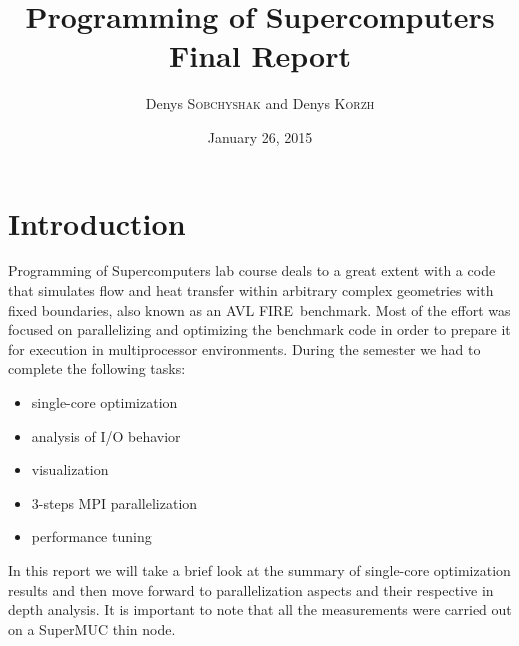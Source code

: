 \documentclass{article}
\title{Programming of Supercomputers \\ Final Report}
\author{Denys \textsc{Sobchyshak} and Denys \textsc{Korzh}}
\date{January 26, 2015}
\begin{document}
\maketitle

\section{Introduction}
Programming of Supercomputers lab course deals to a great extent with a code that simulates flow and heat transfer within arbitrary complex geometries with fixed boundaries, also known as an AVL FIRE\textregistered\ benchmark. Most of the effort was focused on parallelizing and optimizing the benchmark code in order to prepare it for execution in multiprocessor environments. During the semester we had to complete the following tasks:
\begin{itemize}
	\item single-core optimization
	\item analysis of I/O behavior
	\item visualization
	\item 3-steps MPI parallelization
	\item performance tuning
\end{itemize}
In this report we will take a brief look at the summary of single-core optimization results and then move forward to parallelization aspects and their respective in depth analysis. It is important to note that all the measurements were carried out on a SuperMUC thin node.
\end{document}
